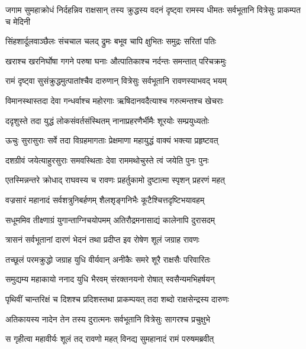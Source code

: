 
\threelineshloka
{जगाम सुमहाक्रोधं निर्दहन्निव राक्षसान्}
{तस्य क्रुद्धस्य वदनं दृष्ट्वा रामस्य धीमतः}
{सर्वभूतानि वित्रेसुः प्राकम्पत च मेदिनी} %

\twolineshloka
{सिंहशार्दूलवाञ्छैलः संचचाल चलद् द्रुमः}
{बभूव चापि क्षुभितः समुद्रः सरितां पतिः} %

\twolineshloka
{खराश्च खरनिर्घोषा गगने परुषा घनाः}
{औत्पातिकाश्च नर्दन्तः समन्तात् परिचक्रमुः} %

\twolineshloka
{रामं दृष्ट्वा सुसंक्रुद्धमुत्पातांश्चैव दारुणान्}
{वित्रेसुः सर्वभूतानि रावणस्याभवद् भयम्} %

\twolineshloka
{विमानस्थास्तदा देवा गन्धर्वाश्च महोरगाः}
{ऋषिदानवदैत्याश्च गरुत्मन्तश्च खेचराः} %

\twolineshloka
{ददृशुस्ते तदा युद्धं लोकसंवर्तसंस्थितम्}
{नानाप्रहरणैर्भीमैः शूरयोः सम्प्रयुध्यतोः} %

\twolineshloka
{ऊचुः सुरासुराः सर्वे तदा विग्रहमागताः}
{प्रेक्षमाणा महायुद्धं वाक्यं भक्त्या प्रहृष्टवत्} %

\twolineshloka
{दशग्रीवं जयेत्याहुरसुराः समवस्थिताः}
{देवा राममथोचुस्ते त्वं जयेति पुनः पुनः} %

\twolineshloka
{एतस्मिन्नन्तरे क्रोधाद् राघवस्य च रावणः}
{प्रहर्तुकामो दुष्टात्मा स्पृशन् प्रहरणं महत्} %

\twolineshloka
{वज्रसारं महानादं सर्वशत्रुनिबर्हणम्}
{शैलशृङ्गनिभैः कूटैश्चित्तदृष्टिभयावहम्} %

\twolineshloka
{सधूममिव तीक्ष्णाग्रं युगान्ताग्निचयोपमम्}
{अतिरौद्रमनासाद्यं कालेनापि दुरासदम्} %

\twolineshloka
{त्रासनं सर्वभूतानां दारणं भेदनं तथा}
{प्रदीप्त इव रोषेण शूलं जग्राह रावणः} %

\twolineshloka
{तच्छूलं परमक्रुद्धो जग्राह युधि वीर्यवान्}
{अनीकैः समरे शूरै राक्षसैः परिवारितः} %

\twolineshloka
{समुद्यम्य महाकायो ननाद युधि भैरवम्}
{संरक्तनयनो रोषात् स्वसैन्यमभिहर्षयन्} %

\twolineshloka
{पृथिवीं चान्तरिक्षं च दिशश्च प्रदिशस्तथा}
{प्राकम्पयत् तदा शब्दो राक्षसेन्द्रस्य दारुणः} %

\twolineshloka
{अतिकायस्य नादेन तेन तस्य दुरात्मनः}
{सर्वभूतानि वित्रेसुः सागरश्च प्रचुक्षुभे} %

\twolineshloka
{स गृहीत्वा महावीर्यः शूलं तद् रावणो महत्}
{विनद्य सुमहानादं रामं परुषमब्रवीत्} %

